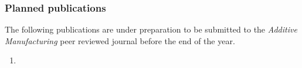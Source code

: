 \documentclass[main.tex]{subfiles}
\begin{document}
\subsubsection{Planned publications}

The following publications are under preparation to be submitted to the \emph{Additive Manufacturing} peer reviewed journal before the end of the year.

\begin{enumerate}
	\item {}
\end{enumerate}

% 

\end{document}
